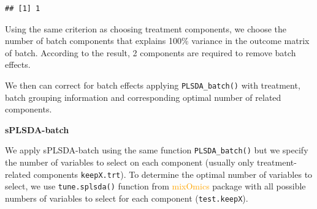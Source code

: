 \documentclass[
]{book}
\newenvironment{Shaded}{\begin{snugshade}}{\end{snugshade}}
\newcommand{\AttributeTok}[1]{\textcolor[rgb]{0.77,0.63,0.00}{#1}}
\newcommand{\DecValTok}[1]{\textcolor[rgb]{0.00,0.00,0.81}{#1}}
\newcommand{\DocumentationTok}[1]{\textcolor[rgb]{0.56,0.35,0.01}{\textbf{\textit{#1}}}}
\newcommand{\FunctionTok}[1]{\textcolor[rgb]{0.00,0.00,0.00}{#1}}
\newcommand{\NormalTok}[1]{#1}
\newcommand{\OtherTok}[1]{\textcolor[rgb]{0.56,0.35,0.01}{#1}}
\newcommand{\SpecialCharTok}[1]{\textcolor[rgb]{0.00,0.00,0.00}{#1}}
\begin{document}
\begin{Shaded}
\end{Shaded}

\begin{verbatim}
## [1] 1
\end{verbatim}

Using the same criterion as choosing treatment components, we choose the number of batch components that explains 100\% variance in the outcome matrix of batch. According to the result, 2 components are required to remove batch effects.

We then can correct for batch effects applying \texttt{PLSDA\_batch()} with treatment, batch grouping information and corresponding optimal number of related components.

\begin{Shaded}
\end{Shaded}

\textbf{sPLSDA-batch}

We apply sPLSDA-batch using the same function \texttt{PLSDA\_batch()} but we specify the number of variables to select on each component (usually only treatment-related components \texttt{keepX.trt}). To determine the optimal number of variables to select, we use \texttt{tune.splsda()} function from \textcolor{orange}{mixOmics} package \citep{rohart2017mixomics} with all possible numbers of variables to select for each component (\texttt{test.keepX}).
\end{document}
